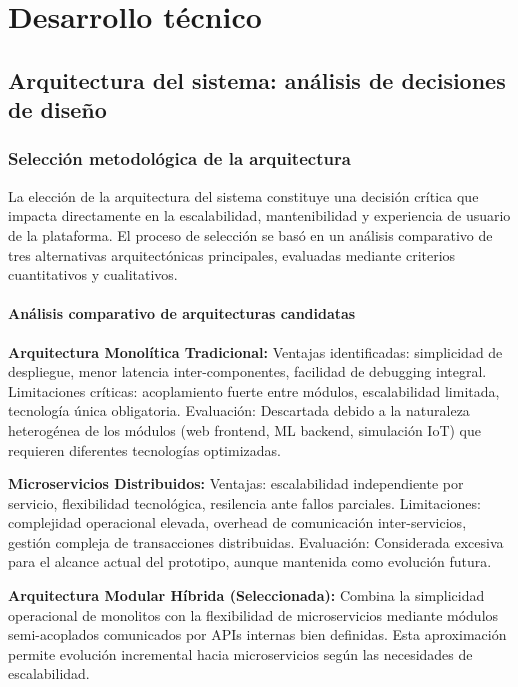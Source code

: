 \chapter{Desarrollo técnico}
\label{ch:desarrollo}

\section{Arquitectura del sistema: análisis de decisiones de diseño}

\subsection{Selección metodológica de la arquitectura}

La elección de la arquitectura del sistema constituye una decisión crítica que impacta directamente en la escalabilidad, mantenibilidad y experiencia de usuario de la plataforma. El proceso de selección se basó en un análisis comparativo de tres alternativas arquitectónicas principales, evaluadas mediante criterios cuantitativos y cualitativos.

\subsubsection{Análisis comparativo de arquitecturas candidatas}

\textbf{Arquitectura Monolítica Tradicional:}
Ventajas identificadas: simplicidad de despliegue, menor latencia inter-componentes, facilidad de debugging integral. 
Limitaciones críticas: acoplamiento fuerte entre módulos, escalabilidad limitada, tecnología única obligatoria.
Evaluación: Descartada debido a la naturaleza heterogénea de los módulos (web frontend, ML backend, simulación IoT) que requieren diferentes tecnologías optimizadas.

\textbf{Microservicios Distribuidos:}
Ventajas: escalabilidad independiente por servicio, flexibilidad tecnológica, resilencia ante fallos parciales.
Limitaciones: complejidad operacional elevada, overhead de comunicación inter-servicios, gestión compleja de transacciones distribuidas.
Evaluación: Considerada excesiva para el alcance actual del prototipo, aunque mantenida como evolución futura.

\textbf{Arquitectura Modular Híbrida (Seleccionada):}
Combina la simplicidad operacional de monolitos con la flexibilidad de microservicios mediante módulos semi-acoplados comunicados por APIs internas bien definidas. Esta aproximación permite evolución incremental hacia microservicios según las necesidades de escalabilidad.

